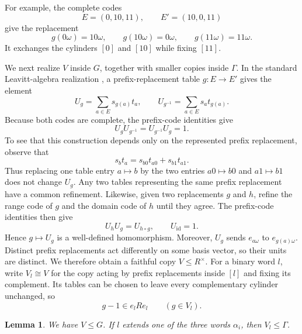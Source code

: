\documentclass[10pt]{article}
\newtheorem{lemma}[theorem]{Lemma}
\newcommand{\id}{\operatorname{id}}
\begin{document}
For example, the complete codes
\[
E=(0,10,11),\qquad E'=(10,0,11)
\]
give the replacement
\[
g(0\omega)=10\omega,\qquad g(10\omega)=0\omega,\qquad g(11\omega)=11\omega.
\]
It exchanges the cylinders $[0]$ and $[10]$ while fixing $[11]$.

We next realize $V$ inside $G$, together with smaller copies inside $\Gamma$. In the standard Leavitt-algebra realization \cite[Section~2.2]{BS16}, a prefix-replacement table $g:E\to E'$ gives the element
\[
U_g=\sum_{a\in E}s_{g(a)}t_a,\qquad
U_{g^{-1}}=\sum_{a\in E}s_at_{g(a)}.
\]
Because both codes are complete, the prefix-code identities give
\[
U_gU_{g^{-1}}=U_{g^{-1}}U_g=1.
\]
To see that this construction depends only on the represented prefix replacement, observe that
\[
s_bt_a=s_{b0}t_{a0}+s_{b1}t_{a1}.
\]
Thus replacing one table entry $a\mapsto b$ by the two entries $a0\mapsto b0$ and $a1\mapsto b1$ does not change $U_g$. Any two tables representing the same prefix replacement have a common refinement. Likewise, given two replacements $g$ and $h$, refine the range code of $g$ and the domain code of $h$ until they agree. The prefix-code identities then give
\[
U_hU_g=U_{h\circ g},\qquad U_{\id}=1.
\]
Hence $g\mapsto U_g$ is a well-defined homomorphism. Moreover, $U_g$ sends $e_{a\omega}$ to $e_{g(a)\omega}$. Distinct prefix replacements act differently on some basis vector, so their units are distinct. We therefore obtain a faithful copy $V\leq R^\times$. For a binary word $l$, write $V_l\cong V$ for the copy acting by prefix replacements inside $[l]$ and fixing its complement. Its tables can be chosen to leave every complementary cylinder unchanged, so
\begin{equation}
g-1\in e_lRe_l\qquad(g\in V_l).
\tag{15}
\end{equation}

\begin{lemma}
We have $V\leq G$. If $l$ extends one of the three words $\alpha_i$, then $V_l\leq\Gamma$.
\end{lemma}
\end{document}
